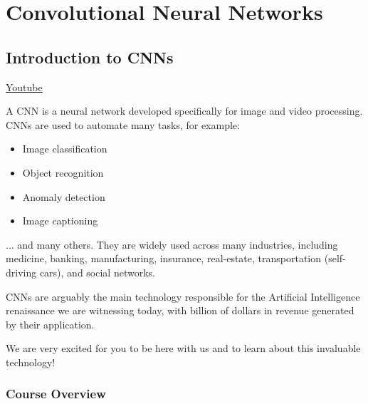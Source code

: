 \part{Convolutional Neural Networks}
\chapter{Introduction to CNNs}
\href{https://www.youtube.com/watch?v=-dLdeL6BAZs&t=1s&ab_channel=Udacity}{Youtube} \newline

A CNN is a neural network developed specifically for image and video processing. CNNs are used to automate many tasks, for example:

\begin{itemize}
    \item Image classification
    \item Object recognition
    \item Anomaly detection
    \item Image captioning
\end{itemize}
... and many others. They are widely used across many industries, including medicine, banking, manufacturing, insurance, real-estate, transportation (self-driving cars), and social networks.\newline

CNNs are arguably the main technology responsible for the Artificial Intelligence renaissance we are witnessing today, with billion of dollars in revenue generated by their application.\newline

We are very excited for you to be here with us and to learn about this invaluable technology!


\section{Course Overview}


